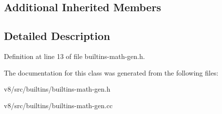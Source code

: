 \subsection*{Additional Inherited Members}


\subsection{Detailed Description}


Definition at line 13 of file builtins-\/math-\/gen.\+h.



The documentation for this class was generated from the following files\+:\begin{DoxyCompactItemize}
\item 
v8/src/builtins/builtins-\/math-\/gen.\+h\item 
v8/src/builtins/builtins-\/math-\/gen.\+cc\end{DoxyCompactItemize}
